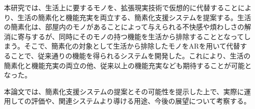 


\begin{jabstract}

本研究では、生活上に要するモノを、拡張現実技術で仮想的に代替することにより、生活の簡素化と機能充実を両立する、簡素化支援システムを提案する。生活の簡素化は、部屋内のモノがあることによって与えられる不快感や煩わしさの解消に寄与するが、同時にそのモノの持つ機能を生活から排除することとなってしまう。そこで、簡素化の対象として生活から排除したモノをARを用いて代替することで、従来通りの機能を得られるシステムを開発した。これにより、生活の簡素化と機能充実の両立の他、従来以上の機能充実なども期待することが可能となった。

本論文では、簡素化支援システムの提案とその可能性を提示した上で、実際に運用しての評価や、関連システムより導ける用途、今後の展望について考察する。

\end{jabstract}

